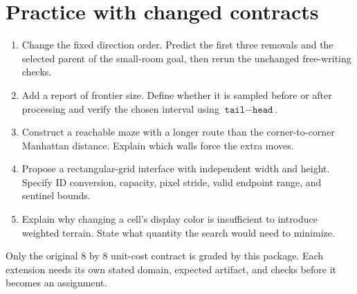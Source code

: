\section{Practice with changed contracts}\label{maze-x-practice}
\begin{enumerate}
  \item Change the fixed direction order. Predict the first three removals and the selected
        parent of the small-room goal, then rerun the unchanged free-writing checks.
  \item Add a report of frontier size. Define whether it is sampled before or after processing
        and verify the chosen interval using \(\texttt{tail}-\texttt{head}\).
  \item Construct a reachable maze with a longer route than the corner-to-corner Manhattan
        distance. Explain which walls force the extra moves.
  \item Propose a rectangular-grid interface with independent width and height. Specify ID
        conversion, capacity, pixel stride, valid endpoint range, and sentinel bounds.
  \item Explain why changing a cell's display color is insufficient to introduce weighted
        terrain. State what quantity the search would need to minimize.
\end{enumerate}
Only the original 8 by 8 unit-cost contract is graded by this package. Each extension
needs its own stated domain, expected artifact, and checks before it becomes an assignment.
